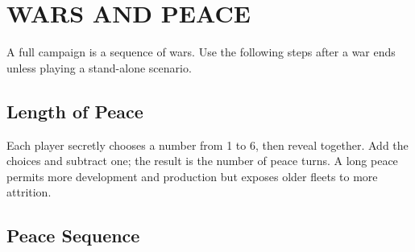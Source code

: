 \section{WARS AND PEACE}

A full campaign is a sequence of wars. Use the following steps after a war
ends unless playing a stand-alone scenario.

\subsection{Length of Peace}

Each player secretly chooses a number from 1 to 6, then reveal together. Add
the choices and subtract one; the result is the number of peace turns. A long
peace permits more development and production but exposes older fleets to more
attrition.

\subsection{Peace Sequence}


